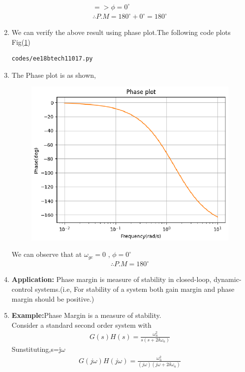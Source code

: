 \begin{enumerate}[label=\thesection.\arabic*.,ref=\thesection.\theenumi]
\begin{align}
=> \phi=0^{\circ}
\\
\therefore P.M=180^{\circ}+0^{\circ}=180^{\circ}
\end{align}

\item
We can verify the above result using phase plot.The following code plots Fig(\ref{fig:ee18btech11017})
\begin{lstlisting}
codes/ee18btech11017.py
\end{lstlisting}
\item
The Phase plot is as shown,
\begin{figure}[!h]
  \includegraphics[width=\columnwidth]{./figs/ee18btech11017.eps}
  \caption{}
  \label{fig:ee18btech11017}
\end{figure}
We can observe that at $\omega_{gc}=0$ , $\phi=0^{\circ}$
\\
\begin{align}
\therefore P.M=180^{\circ}
\end{align}
\item
\textbf{Application:} 
Phase margin is measure of stability in closed-loop, dynamic-control systems.(i.e, For stability of a system both gain margin and phase margin should be positive.)
\item
\textbf{Example:}Phase Margin is a measure of stability. \\
Consider a standard second order system with 
\\
\begin{align}
G(s)H(s)=\frac{\omega_{n}^{2}}{s(s+2 \delta \omega_{n})}
\label{eq:3} 
\end{align}
Sunstituting,s=j$\omega$
\begin{align}
G(j\omega)H(j\omega)=\frac{\omega_{n}^{2}}{(j\omega)(j\omega+2\delta\omega_{n})}
\\
\end{align}


\end{enumerate}
